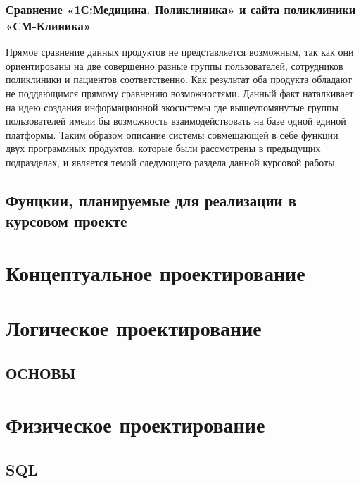 \documentclass[14pt,a4paper,russian]{extreport}
\begin{document}
\subsection{Сравнение «1С:Медицина. Поликлиника» и сайта поликлиники «СМ-Клиника»}
Прямое сравнение данных продуктов не представляется возможным, так как они ориентированы на две
совершенно разные группы пользователей, сотрудников поликлиники и пациентов соответственно. Как
результат оба продукта обладают не поддающимся прямому сравнению возможностями. Данный факт
наталкивает на идею создания информационной экосистемы где вышеупомянутые группы пользователей
имели бы возможность взаимодействовать на базе одной единой платформы. Таким образом описание
системы совмещающей в себе функции двух программных продуктов, которые были рассмотрены в
предыдущих подразделах, и является темой следующего раздела данной курсовой работы.


\section{Фунцкии, планируемые для реализации в курсовом проекте}


\chapter{Концептуальное проектирование}



\chapter{Логическое проектирование}

\section{ОСНОВЫ}



\chapter{Физическое проектирование}

\section{SQL}



{}
\end{document}
